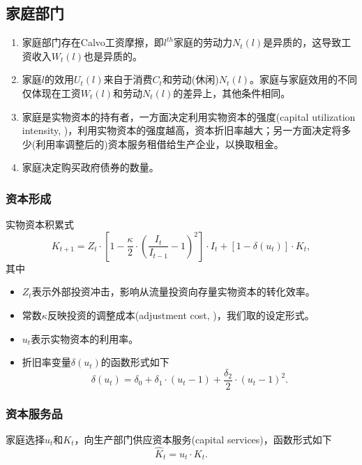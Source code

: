 \subsection{家庭部门}
\label{sec:HH-sector}
\begin{enumerate}
\item 家庭部门存在Calvo工资摩擦，即$l^{th}$家庭的劳动力$N_t(l)$是异质的，这导致工资收入$W_t(l)$也是异质的\citep{Calvo:1983uq}。
\item 家庭$l$的效用$U_t(l)$来自于消费$C_t$和劳动(休闲)$N_t(l)$。家庭与家庭效用的不同仅体现在工资$W_t(l)$和劳动$N_t(l)$的差异上，其他条件相同。
\item 家庭是实物资本的持有者，一方面决定利用实物资本的强度(capital utilization intensity, \cite{Greenwood:1988jn})，利用实物资本的强度越高，资本折旧率越大；另一方面决定将多少(利用率调整后的)资本服务租借给生产企业，以换取租金。

\item 家庭决定购买政府债券的数量。
\end{enumerate}

\subsubsection{资本形成}
实物资本积累式
\begin{equation}
\label{eq:MS-capital-accumulation}
K_{t+1} = Z_t \cdot \left[
1 - \frac{\kappa}{2} \cdot \left(\frac{I_t}{I_{t-1}} -1\right)^2
\right] \cdot I_t + \left[
1- \delta(u_t)
\right] \cdot K_t,
\end{equation}
其中\begin{itemize}
\item $Z_t$表示外部投资冲击，影响从流量投资向存量实物资本的转化效率。
\item 常数$\kappa$反映投资的调整成本(adjustment cost, \cite{Lucasjoin:1971hx, Hayashi:1982bc})，我们取\cite{Christiano:2005ib}的设定形式。
\item $u_t$表示实物资本的利用率。
\item 折旧率变量$\delta(u_t)$的函数形式如下
\begin{equation}
\label{eq:MS-capital-depreciation}
\delta(u_t) = \delta_0 + \delta_1 \cdot (u_t -1) + \frac{\delta_2}{2} \cdot \left(u_t -1\right)^2.
\end{equation}
\end{itemize}

\subsubsection{资本服务品}
家庭选择$u_t$和$K_t$，向生产部门供应资本服务(capital services)，函数形式如下
\begin{equation}
\label{eq:MC-hh-capital-services}
\hat{K}_t = u_t \cdot K_t.
\end{equation}

